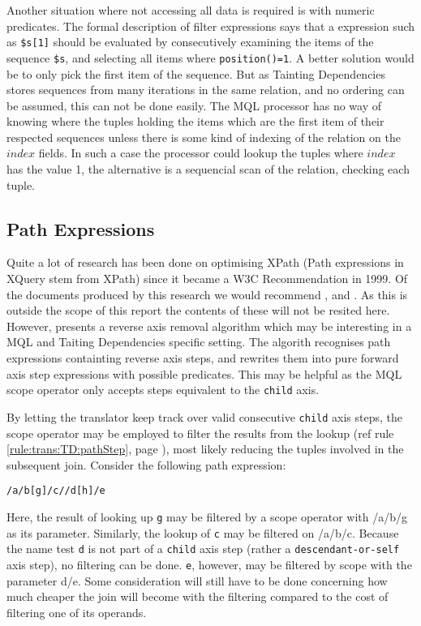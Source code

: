Another situation where not accessing all data is required is with numeric predicates. The formal description of
filter expressions\cite{xquery_semantics} says that a expression such as \texttt{\$s[1]} should be evaluated by
consecutively examining the items of the sequence \texttt{\$s}, and selecting all items where
\texttt{position()=1}. A better solution would be to only pick the first item of the sequence. But as Tainting
Dependencies stores sequences from many iterations in the same relation, and no ordering can be assumed, this can
not be done easily. The MQL processor has no way of knowing where the tuples holding the items which are the
first item of their respected sequences unless there is some kind of indexing of the relation on the $index$
fields. In such a case the processor could lookup the tuples where $index$ has the value 1, the alternative is a
sequencial scan of the relation, checking each tuple.

\subsection{Path Expressions}
Quite a lot of research has been done on optimising XPath (Path expressions in XQuery stem from XPath) since it
became a W3C Recommendation in 1999. Of the documents produced by this research we would recommend
\cite{optimize_logic}, \cite{optimize_michiels} and \cite{optimize_xsltPath}. As this is outside the scope of this
report the contents of these will not be resited here. However, \cite{optimize_forward} presents a reverse axis
removal algorithm which may be interesting in a MQL and Taiting Dependencies specific setting. The algorith
recognises path expressions containting reverse axis steps, and rewrites them into pure forward axis step
expressions with possible predicates. This may be helpful as the MQL \textsf{scope} operator only accepts steps
equivalent to the \texttt{child} axis.

By letting the translator keep track over valid consecutive \texttt{child} axis steps, the \textsf{scope} operator
may be employed to filter the results from the lookup (ref rule \ref{rule:trans:TD:pathStep}, page
\pageref{rule:trans:TD:pathStep}), most likely reducing the tuples involved in the subsequent join. Consider the
following path expression:

\begin{center}
\texttt{/a/b[g]/c//d[h]/e}
\end{center}

Here, the result of looking up \texttt{g} may be filtered by a \textsf{scope} operator with \textsf{/a/b/g} as its
parameter. Similarly, the lookup of \texttt{c} may be filtered on \textsf{/a/b/c}. Because the name test \texttt{d}
is not part of a \texttt{child} axis step (rather a \texttt{descendant-or-self} axis step), no filtering can be
done. \texttt{e}, however, may be filtered by \textsf{scope} with the parameter \textsf{d/e}. Some consideration
will still have to be done concerning how much cheaper the join will become with the filtering compared to the cost
of filtering one of its operands.

